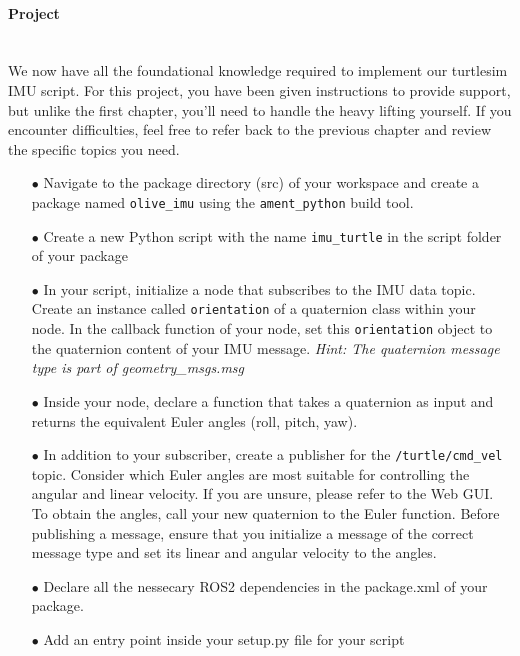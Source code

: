 \documentclass{article}
\begin{document}
\paragraph{Project}~\\
We now have all the foundational knowledge required to implement our turtlesim IMU script. For this project, you have been given instructions to provide support, but unlike the first chapter, you'll need to handle the heavy lifting yourself. If you encounter difficulties, feel free to refer back to the previous chapter and review the specific topics you need.
\begin{enumerate}
    \item[$\bullet$] Navigate to the package directory (src) of your workspace and create a package named \texttt{olive\_imu} using the \texttt{ament\_python} build tool.

    \item[$\bullet$] Create a new Python script with the name \texttt{imu\_turtle} in the script folder of your package

    \item[$\bullet$] In your script, initialize a node that subscribes to the IMU data topic. Create an instance called \texttt{orientation} of a quaternion class within your node. In the callback function of your node, set this \texttt{orientation} object to the quaternion content of your IMU message. \textit{Hint: The quaternion message type is part of geometry\_msgs.msg}

    \item[$\bullet$] Inside your node, declare a function that takes a quaternion as input and returns the equivalent Euler angles (roll, pitch, yaw).

    \item[$\bullet$] In addition to your subscriber, create a publisher for the \texttt{/turtle/cmd\_vel} topic. Consider which Euler angles are most suitable for controlling the angular and linear velocity. If you are unsure, please refer to the Web GUI. To obtain the angles, call your new quaternion to the Euler function. Before publishing a message, ensure that you initialize a message of the correct message type and set its linear and angular velocity to the angles.

    \item[$\bullet$] Declare all the nessecary ROS2 dependencies in the package.xml of your package.

    \item[$\bullet$] Add an entry point inside your setup.py file for your script


\end{enumerate}
\end{document}
